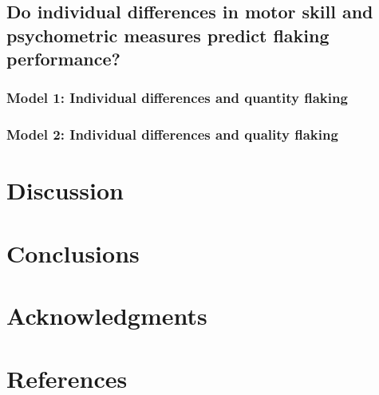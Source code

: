 \documentclass[smallextended]{svjour3}       %
\begin{document}
\hypertarget{do-individual-differences-in-motor-skill-and-psychometric-measures-predict-flaking-performance}{%
\subsection{\texorpdfstring{\textbf{Do individual differences in motor
skill and psychometric measures predict flaking performance?
}}{Do individual differences in motor skill and psychometric measures predict flaking performance? }}\label{do-individual-differences-in-motor-skill-and-psychometric-measures-predict-flaking-performance}}

\hypertarget{model-1-individual-differences-and-quantity-flaking}{%
\subsubsection{\texorpdfstring{\textbf{Model 1: Individual differences
and quantity
flaking}}{Model 1: Individual differences and quantity flaking}}\label{model-1-individual-differences-and-quantity-flaking}}

\hypertarget{model-2-individual-differences-and-quality-flaking}{%
\subsubsection{\texorpdfstring{\textbf{Model 2: Individual differences
and quality
flaking}}{Model 2: Individual differences and quality flaking}}\label{model-2-individual-differences-and-quality-flaking}}

\hypertarget{discussion}{%
\section{\texorpdfstring{\textbf{Discussion}}{Discussion}}\label{discussion}}

\hypertarget{conclusions}{%
\section{\texorpdfstring{\textbf{Conclusions}}{Conclusions}}\label{conclusions}}

\hypertarget{acknowledgments}{%
\section{\texorpdfstring{\textbf{Acknowledgments}}{Acknowledgments}}\label{acknowledgments}}

\hypertarget{references}{%
\section*{\texorpdfstring{\textbf{References}}{References}}\label{references}}
\end{document}
